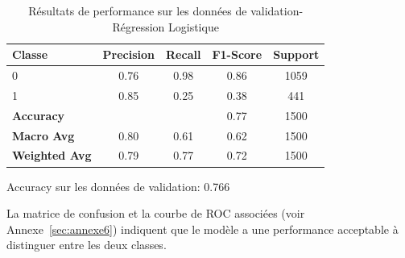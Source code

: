 \begin{table}[H]
\centering
\caption{Résultats de performance sur les données de validation-Régression Logistique}
\label{tab:performance_validation_RegL}
\begin{tabular}{|l|c|c|c|c|}
\hline
\textbf{Classe}       & \textbf{Precision} & \textbf{Recall} & \textbf{F1-Score} & \textbf{Support} \\ \hline
0                     & 0.76               & 0.98            & 0.86              & 1059             \\ \hline
1                     & 0.85               & 0.25            & 0.38              & 441              \\ \hline
\textbf{Accuracy} & \multicolumn{2}{|c|}{} & 0.77       & 1500     \\ \hline
\textbf{Macro Avg}    & 0.80               & 0.61            & 0.62              & 1500             \\ \hline
\textbf{Weighted Avg} & 0.79               & 0.77            & 0.72              & 1500             \\ \hline
\end{tabular}
\begin{flushleft}
Accuracy sur les données de validation: 0.766
\end{flushleft}
\end{table}

\begin{flushleft}
La matrice de confusion et la courbe de ROC associées (voir Annexe~\ref{sec:annexe6}) indiquent que le modèle a une performance acceptable à distinguer entre les deux classes. 
\end{flushleft}

